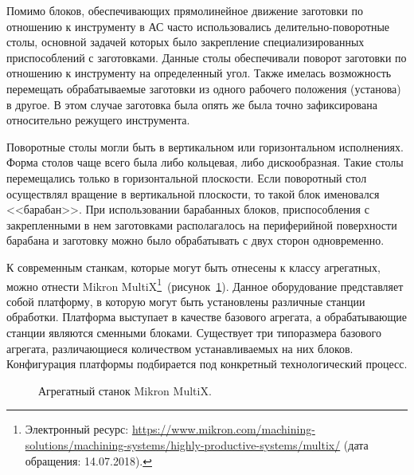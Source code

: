 Помимо блоков, обеспечивающих прямолинейное движение заготовки по отношению к инструменту в АС часто использовались делительно-поворотные столы, основной задачей которых было закрепление специализированных приспособлений с заготовками. Данные столы обеспечивали поворот заготовки по отношению к инструменту на определенный угол. Также имелась возможность перемещать обрабатываемые заготовки из одного рабочего положения (установа) в другое. В этом случае заготовка была опять же была точно зафиксирована относительно режущего инструмента. 

Поворотные столы могли быть в вертикальном или горизонтальном исполнениях. Форма столов чаще всего была либо кольцевая, либо дискообразная. Такие столы перемещались только в горизонтальной плоскости. Если поворотный стол осуществлял вращение в вертикальной плоскости, то такой блок именовался <<барабан>>. При использовании барабанных блоков, приспособления с закрепленными в нем заготовками располагалось на периферийной поверхности барабана и заготовку можно было обрабатывать с двух сторон одновременно.

К современным станкам, которые могут быть отнесены к классу агрегатных, можно отнести Mikron MultiX\footnote{Электронный ресурс: {\small\url{https://www.mikron.com/machining-solutions/machining-systems/highly-productive-systems/multix/}} (дата обращения: 14.07.2018).}~(рисунок~\cref{fig:mikron}). Данное оборудование представляет собой платформу, в которую могут быть установлены различные станции обработки. Платформа выступает в качестве базового агрегата, а обрабатывающие станции являются сменными блоками. Существует три типоразмера базового агрегата, различающиеся количеством устанавливаемых на них блоков. Конфигурация платформы подбирается под конкретный технологический процесс.

\begin{figure}[ht]
	\caption{Агрегатный станок Mikron MultiX.}\label{fig:mikron}
\end{figure}

